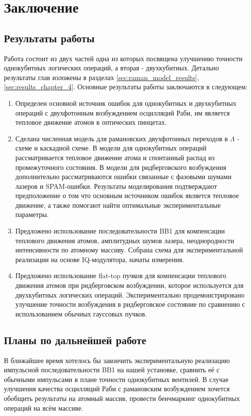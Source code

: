 \section{Заключение}
\label{sec:chapter_5}

\subsection{Результаты работы}

Работа состоит из двух частей одна из которых посвящена улучшению точности однокубитных логических операций, а вторая - двухкубитных. Детально результаты глав изложены в разделах \ref{sec:raman_model_results}, \ref{sec:results_chapter_4}. Основные результаты работы заключаются в следующем:

\begin{enumerate}
	\item Определен основной источник ошибок для однокубитных и двухкубитных операций с двухфотонным возбуждением осцилляций Раби, им является тепловое движение атомов в оптических пинцетах. 

	\item Сделана численная модель для рамановских двухфотонных переходов в $\Lambda$ - схеме и каскадной схеме. В модели для однокубитных операций рассматривается тепловое движение атома и спонтанный распад из промежуточного состояния. В модели для ридберговского возбуждения дополнительно рассматриваются ошибки связанные с фазовыми шумами лазеров и SPAM-ошибки. Результаты моделирования подтверждают предположение о том что основным источником ошибок является тепловое движение, а также помогают найти оптимальные экспериментальные параметры.

	\item Предложено использование последовательности BB1 для компенсации теплового движения атомов, амплитудных шумов лазера, неоднородности интенсивности по атомному массиву. Собрана схема для экспериментальной реализации на основе IQ-модулятора, начаты измерения.

	\item Предложено использование flat-top пучков для компенсации теплового движения атомов при ридберговском возбуждении, которое используется для двухкубитных логических операций. Экспериментально продемонстрировано улучшение точности возбуждения в ридберговское состояние по сравнению с использованием обычных гауссовых пучков.
\end{enumerate}

\subsection{Планы по дальнейшей работе}

В ближайшее время хотелось бы закончить экспериментальную реализацию импульсной последовательности BB1 на нашей установке, сравнить её с обычными импульсами в плане точности однокубитных вентилей. В случае улучшения качества осцилляций Раби с рамановским возбуждением хочется обобщить результаты на атомный массив, провести бенчмаркинг однокубитных операций на всём массиве. 

\newpage
